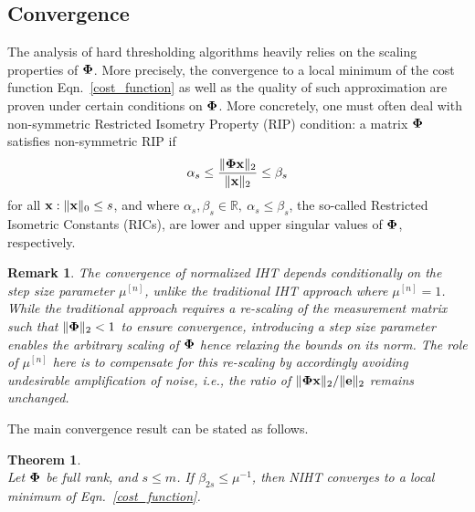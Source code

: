 \documentclass{article}
\newtheorem{theorem}{Theorem}
\newtheorem{remark}{Remark}
\begin{document}
\subsection{Convergence} 
The analysis of hard thresholding algorithms heavily relies on the scaling properties of ${\bf \Phi}$. More precisely, the convergence to a local minimum of the cost function Eqn.~\ref{cost_function} as well as the quality of such approximation are proven under certain conditions on ${\bf \Phi}$. More concretely, one must often deal with non-symmetric Restricted Isometry Property (RIP) condition: a matrix ${\bf \Phi}$ satisfies non-symmetric RIP if
\begin{equation}\label{rip}
\alpha_{s} \leq \frac{\|{\bf \Phi} {\bf x}\|_2}{\|{\bf x}\|_2} \leq \beta_{s}
\end{equation}
for all ${\bf x}: \|{\bf x}\|_0 \leq s$, and where $\alpha_s, \beta_s \in \mathbb{R}, \ \alpha_s\leq \beta_s$, the so-called Restricted Isometric Constants (RICs), are lower and upper singular values of ${\bf \Phi}$, respectively.

\begin{remark}\label{remark_noise_amp}
The convergence of normalized IHT depends conditionally on the step size parameter $\mu^{[n]}$, unlike the traditional IHT approach where $\mu^{[n]}=1$.
While the traditional approach requires a re-scaling of the measurement matrix such that $\|{\bf \Phi}\|_2 <1$ to ensure convergence, introducing a step size parameter enables the arbitrary scaling of ${\bf \Phi}$ hence relaxing the bounds on its norm. The role of $\mu^{[n]}$ here is to compensate for this re-scaling by accordingly avoiding undesirable amplification of noise, i.e., the ratio of $\|{\bf \Phi x}\|_2/\|{\bf e}\|_2$ remains unchanged. 
\end{remark}
\vspace{-0.5em}
The main convergence result can be stated as follows.
\begin{theorem}\label{theorem_convergence_IHT}
{\rm{\cite{blumensath2012greedy}}}\\ 
Let ${\bf \Phi}$ be full rank, and $s\leq m$. If $\beta_{2s}\leq\mu^{-1}$, then NIHT converges to a local minimum of Eqn.~\ref{cost_function}.
\end{theorem}
\vspace{-1em}
\end{document}
